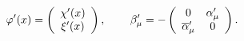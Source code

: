 \begin{equation}
\varphi ^{\prime }(x)=\left(
\begin{array}{c}
\chi ^{\prime }(x) \\
\xi ^{\prime }(x)
\end{array}
\right) ,\hspace{0.3in}\beta _\mu ^{\prime }=-\left(
\begin{array}{cc}
0 & \alpha _\mu ^{\prime } \\
\overline{\alpha }_\mu ^{\prime } & 0
\end{array}
\right) . \label{36}
\end{equation}

